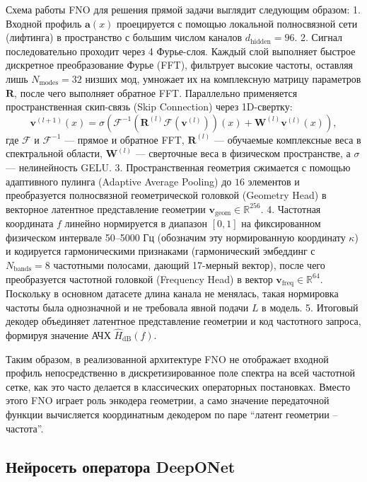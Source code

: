 Схема работы FNO для решения прямой задачи выглядит следующим образом:
1. Входной профиль $\mathbf{a}(x)$ проецируется с помощью локальной полносвязной сети (лифтинга) в пространство с большим числом каналов $d_{\text{hidden}} = 96$.
2. Сигнал последовательно проходит через 4 Фурье-слоя. Каждый слой выполняет быстрое дискретное преобразование Фурье (FFT), фильтрует высокие частоты, оставляя лишь $N_{\text{modes}} = 32$ низших мод, умножает их на комплексную матрицу параметров $\mathbf{R}$, после чего выполняет обратное FFT. Параллельно применяется пространственная скип-связь (Skip Connection) через 1D-свертку:
\begin{equation}
    \mathbf{v}^{(l+1)}(x) = \sigma \left( \mathcal{F}^{-1} \left( \mathbf{R}^{(l)} \mathcal{F}(\mathbf{v}^{(l)}) \right)(x) + \mathbf{W}^{(l)} \mathbf{v}^{(l)}(x) \right),
\end{equation}
где $\mathcal{F}$ и $\mathcal{F}^{-1}$ — прямое и обратное FFT, $\mathbf{R}^{(l)}$ — обучаемые комплексные веса в спектральной области, $\mathbf{W}^{(l)}$ — сверточные веса в физическом пространстве, а $\sigma$ — нелинейность GELU.
3. Пространственная геометрия сжимается с помощью адаптивного пулинга (Adaptive Average Pooling) до $16$ элементов и преобразуется полносвязной геометрической головкой (Geometry Head) в векторное латентное представление геометрии $\mathbf{v}_{\text{geom}} \in \mathbb{R}^{256}$.
4. Частотная координата $f$ линейно нормируется в диапазон $[0, 1]$ на фиксированном физическом интервале 50--5000 Гц (обозначим эту нормированную координату $\kappa$) и кодируется гармоническими признаками (гармонический эмбеддинг с $N_{\mathrm{bands}} = 8$ частотными полосами, дающий 17-мерный вектор), после чего преобразуется частотной головкой (Frequency Head) в вектор $\mathbf{v}_{\text{freq}} \in \mathbb{R}^{64}$. Поскольку в основном датасете длина канала не менялась, такая нормировка частоты была однозначной и не требовала явной подачи $L$ в модель.
5. Итоговый декодер объединяет латентное представление геометрии и код частотного запроса, формируя значение АЧХ $\widehat{H}_{\text{dB}}(f)$.

Таким образом, в реализованной архитектуре FNO не отображает входной профиль непосредственно в дискретизированное поле спектра на всей частотной сетке, как это часто делается в классических операторных постановках. Вместо этого FNO играет роль энкодера геометрии, а само значение передаточной функции вычисляется координатным декодером по паре ``латент геометрии -- частота''.

\subsection{Нейросеть оператора DeepONet}
\label{subsec:deeponet}

